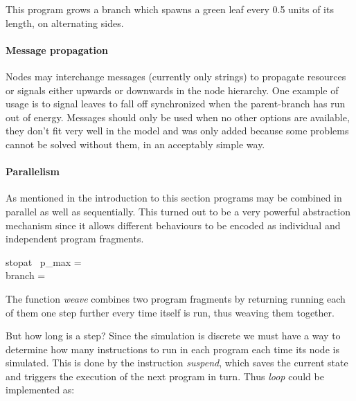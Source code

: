 This program grows a branch which spawns a green leaf every 0.5 units
of its length, on alternating sides.

\paragraph{Message propagation}

\label{monadic:messages}

    Nodes may interchange messages (currently only strings)
    to propagate resources or signals either upwards or downwards in
    the node hierarchy. One example of usage is to signal leaves to
    fall off synchronized when the parent-branch has run out of
    energy. Messages should only be used when no other options are
    available, they don't fit very well in the model and was only
    added because some problems cannot be solved without them, in an
    acceptably simple way.


\paragraph{Parallelism}

    As mentioned in the introduction to this section programs may be
    combined in parallel as well as sequentially. This turned out to
    be a very powerful abstraction mechanism since it allows different
    behaviours to be encoded as individual and independent program
    fragments.

\begin{haskell*}
stop\uc{}at \ p_{max} =  \\
branch = 
\end{haskell*}

    The function \emph{weave} combines two program fragments by
    returning running each of them one step further every time itself
    is run, thus weaving them together.

    But how long is a step? Since the simulation is discrete we must
    have a way to determine how many instructions to run in each
    program each time its node is simulated. This is done by the
    instruction \emph{suspend}, which saves the current state and 
    triggers the execution of the next program in turn.
    Thus \emph{loop} could be implemented as:

